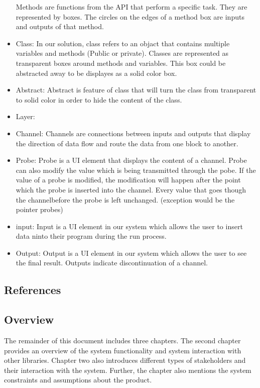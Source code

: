 \documentclass[a4paper,10pt]{article} \usepackage[margin=1.0in]{geometry} \usepackage{pdfpages} \usepackage{graphicx}
\begin{document}
\begin{itemize}
		Methods are functions from the API that perform a specific task. They are represented by boxes.
		The circles on the edges of a method box are inputs and outputs of that method.
	\item Class: 
		In our solution, class refers to an objact that contains multiple variables and methods (Public or private).
		Classes are represented as transparent boxes around methods and variables. This box could be abstracted away to be displayes as a solid color box.
	\item Abstract:
		Abstract is feature of class that will turn the class from transparent to solid color in order to hide the content of the class.
	\item Layer: 
	\item Channel:
		 Channels are connections between inputs and outputs that display the direction of data flow and route the data from one block to another. 
	\item Probe:
		Probe is a UI element that displays the content of a channel.
		Probe can also modify the value which is being transmitted through the pobe.
		If the value of a probe is modified, the modification will happen after the point which the probe is inserted into the channel.
		Every value that goes though the channelbefore the probe is left unchanged. (exception would be the pointer probes)
	\item input:
		Input is a UI element in our system which allows the user to insert data ninto their program during the run process.
	\item Output:
		Output is a UI element in our system which allows the user to see the final result. Outputs indicate discontinuation of a channel.
\end{itemize}
\subsection{References}
\subsection{Overview}

The remainder of this document includes three chapters. 
The second chapter provides an overview of the system functionality and system interaction with other libraries. 
Chapter two also introduces different types of stakeholders and their interaction with the system. 
Further, the chapter also mentions the system constraints and assumptions about the product.
\end{document}
